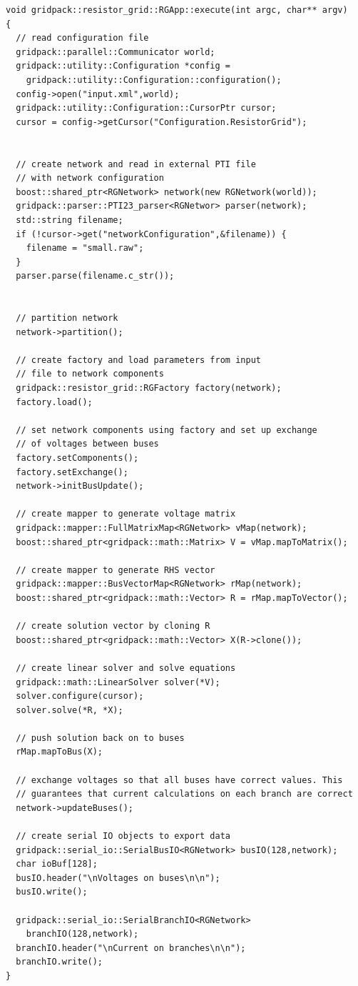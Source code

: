 \documentclass[12pt]{report} %
\begin{document}
{
\color{red}
\begin{Verbatim}[fontseries=b]
void gridpack::resistor_grid::RGApp::execute(int argc, char** argv)
{
  // read configuration file
  gridpack::parallel::Communicator world;
  gridpack::utility::Configuration *config =
    gridpack::utility::Configuration::configuration();
  config->open("input.xml",world);
  gridpack::utility::Configuration::CursorPtr cursor;
  cursor = config->getCursor("Configuration.ResistorGrid");


  // create network and read in external PTI file
  // with network configuration
  boost::shared_ptr<RGNetwork> network(new RGNetwork(world));
  gridpack::parser::PTI23_parser<RGNetwor> parser(network);
  std::string filename;
  if (!cursor->get("networkConfiguration",&filename)) {
    filename = "small.raw";
  }
  parser.parse(filename.c_str());


  // partition network
  network->partition();

  // create factory and load parameters from input
  // file to network components
  gridpack::resistor_grid::RGFactory factory(network);
  factory.load();

  // set network components using factory and set up exchange
  // of voltages between buses
  factory.setComponents();
  factory.setExchange();
  network->initBusUpdate();

  // create mapper to generate voltage matrix
  gridpack::mapper::FullMatrixMap<RGNetwork> vMap(network);
  boost::shared_ptr<gridpack::math::Matrix> V = vMap.mapToMatrix();

  // create mapper to generate RHS vector
  gridpack::mapper::BusVectorMap<RGNetwork> rMap(network);
  boost::shared_ptr<gridpack::math::Vector> R = rMap.mapToVector();

  // create solution vector by cloning R
  boost::shared_ptr<gridpack::math::Vector> X(R->clone());

  // create linear solver and solve equations
  gridpack::math::LinearSolver solver(*V);
  solver.configure(cursor);
  solver.solve(*R, *X);

  // push solution back on to buses
  rMap.mapToBus(X);

  // exchange voltages so that all buses have correct values. This
  // guarantees that current calculations on each branch are correct
  network->updateBuses();

  // create serial IO objects to export data
  gridpack::serial_io::SerialBusIO<RGNetwork> busIO(128,network);
  char ioBuf[128];
  busIO.header("\nVoltages on buses\n\n");
  busIO.write();

  gridpack::serial_io::SerialBranchIO<RGNetwork>
    branchIO(128,network);
  branchIO.header("\nCurrent on branches\n\n");
  branchIO.write();
}
\end{Verbatim}
}
\end{document}
